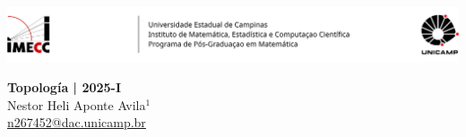 \documentclass[a4paper, 11pt]{article}
\begin{document}

\- \vspace{-0.3in}
\par\noindent\includegraphics[width = \textwidth]{Imagens/Header.png} 


\begin{center} %
\textbf{Topología | 2025-I}    \\ {\small 
Nestor Heli Aponte Avila\(^1\) \\ 
\href{mailto:n267452@dac.unicamp.br}{\url{n267452@dac.unicamp.br}}} %

\end{center} %


\theoremstyle{definition}
\newtheorem*{definition}{}

\theoremstyle{plain}
\newtheorem*{lemma}{{\scriptsize \(\square\)}}
\newtheorem*{proposition}{{\large \(\square\)}}
\newtheorem*{theorem}{{\large \(\blacksquare\)}}

\makeatletter
\def\@thm@headpunct{} %

\def\th@plain{%
  \thm@headpunct{} %
}

\def\th@definition{%
  \thm@headpunct{} %
}

\def\th@remark{%
  \thm@headpunct{} %
}
\makeatother
\end{document}

